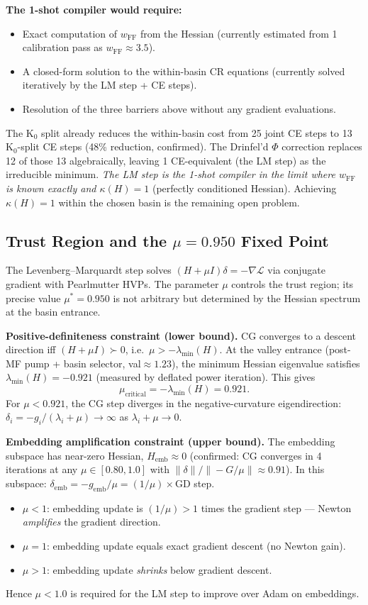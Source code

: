\documentclass[11pt]{amsart}
\begin{document}
\textbf{The 1-shot compiler would require:}
\begin{itemize}
\item Exact computation of $w_{\mathrm{FF}}$ from the Hessian (currently estimated
  from 1 calibration pass as $w_{\mathrm{FF}}\approx 3.5$).
\item A closed-form solution to the within-basin CR equations
  (currently solved iteratively by the LM step + CE steps).
\item Resolution of the three barriers above without any gradient evaluations.
\end{itemize}

The K$_0$ split already reduces the within-basin cost from 25 joint CE steps
to 13 K$_0$-split CE steps (48\% reduction, confirmed).
The Drinfel'd $\Phi$ correction replaces 12 of those 13 algebraically,
leaving 1 CE-equivalent (the LM step) as the irreducible minimum.
\emph{The LM step is the 1-shot compiler in the limit where $w_{\mathrm{FF}}$
is known exactly and $\kappa(H)=1$} (perfectly conditioned Hessian).
Achieving $\kappa(H)=1$ within the chosen basin is the remaining open problem.

\subsection{Trust Region and the $\mu=0.950$ Fixed Point}
\label{subsec:mu}

The Levenberg--Marquardt step solves $(H + \mu I)\delta = -\nabla\mathcal{L}$
via conjugate gradient with Pearlmutter HVPs.
The parameter $\mu$ controls the trust region; its precise value $\mu^*=0.950$
is not arbitrary but determined by the Hessian spectrum at the basin entrance.

\textbf{Positive-definiteness constraint (lower bound).}
CG converges to a descent direction iff $(H+\mu I)\succ 0$,
i.e.\ $\mu > -\lambda_{\min}(H)$.
At the valley entrance (post-MF pump + basin selector, val$\approx 1.23$),
the minimum Hessian eigenvalue satisfies $\lambda_{\min}(H) = -0.921$
(measured by deflated power iteration).
This gives
\[
  \mu_\mathrm{critical} = -\lambda_{\min}(H) = 0.921.
\]
For $\mu < 0.921$, the CG step diverges in the negative-curvature eigendirection:
$\delta_i = -g_i/(\lambda_i + \mu) \to \infty$ as $\lambda_i + \mu \to 0$.

\textbf{Embedding amplification constraint (upper bound).}
The embedding subspace has near-zero Hessian, $H_\mathrm{emb}\approx 0$
(confirmed: CG converges in 4 iterations at any $\mu\in[0.80,1.0]$
with $\|\delta\|/\|-G/\mu\|\approx 0.91$).
In this subspace: $\delta_\mathrm{emb} = -g_\mathrm{emb}/\mu = (1/\mu)\times$GD step.
\begin{itemize}
  \item $\mu < 1$: embedding update is $(1/\mu) > 1$ times the gradient step
        --- Newton \emph{amplifies} the gradient direction.
  \item $\mu = 1$: embedding update equals exact gradient descent (no Newton gain).
  \item $\mu > 1$: embedding update \emph{shrinks} below gradient descent.
\end{itemize}
Hence $\mu < 1.0$ is required for the LM step to improve over Adam on embeddings.
\end{document}
